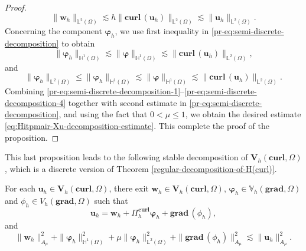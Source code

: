 \begin{proof}
\begin{equation}
\|\bm{w}_h\|_{\mathbb{L}^2(\Omega)} \lesssim h \|\textbf{curl} \,(\bm{u}_h)\|_{\mathbb{L}^2(\Omega)} \lesssim   \|\bm{u}_h\|_{\mathbb{L}^2(\Omega)}.
\end{equation}
Concerning the component $\bm{\varphi}_h$, we use first inequality in \eqref{pr-eq:semi-discrete-decomposition} to obtain
\begin{equation}
\|\bm{\varphi}_h\|_{\mathbb{H}^1(\Omega)} \lesssim \|\bm{\varphi}\|_{\mathbb{H}^1(\Omega)} \lesssim \|\textbf{curl} \,(\bm{u}_h)\|_{\mathbb{L}^2(\Omega)},
\end{equation}
and
\begin{equation}\label{pr-eq:semi-discrete-decomposition-4}
\|\bm{\varphi}_h\|_{\mathbb{L}^2(\Omega)} \leq \|\bm{\varphi}_h\|_{\mathbb{H}^1(\Omega)}  \lesssim  \|\bm{\varphi}\|_{\mathbb{H}^1(\Omega)}  \lesssim \|\textbf{curl} \,(\bm{u}_h)\|_{\mathbb{L}^2(\Omega)}.
\end{equation}
Combining \eqref{pr-eq:semi-discrete-decomposition-1}--\eqref{pr-eq:semi-discrete-decomposition-4} together with second estimate in \eqref{pr-eq:semi-discrete-decomposition}, and using the fact that $0 < \mu \leq 1$, we obtain the desired estimate  \eqref{eq:Hitpmair-Xu-decomposition-estimate}. This complete the proof of the proposition. 
\end{proof}

This last proposition leads to the following stable decomposition of $\bm{V}_h(\textbf{curl},\Omega)$, which is a discrete version of Theorem \ref{regular-decomposition-of-H(curl)}.

\begin{theorem}\label{thm:stable-Hitpmair-Xu-decomposition}
For each $\bm{u}_h \in \bm{V}_h(\textbf{curl},\Omega)$, there exit $\bm{w}_h \in \bm{V}_h(\textbf{curl},\Omega)$, $\bm{\varphi}_h \in  \mathbb{V}_h(\textbf{grad},\Omega)$ and $\phi_h \in V_h(\textbf{grad},\Omega)$ such that   
\begin{equation}\label{eq:stable-Hitpmair-Xu-decomposition}
\bm{u}_h=\bm{w}_h+\Pi_h^{\textbf{curl}} \bm{\varphi}_h + \textbf{grad}\,(\phi_h),
\end{equation}
and 
\begin{equation}\label{eq:stable-Hitpmair-Xu-decomposition-estimate}
\|\bm{w}_h\|_{A_\mu}^2 + \|\bm{\varphi}_h\|_{\mathbb{H}^1(\Omega)}^2 + \mu \|\bm{\varphi}_h\|_{\mathbb{L}^2(\Omega)}^2 + \|\textbf{grad}\,(\phi_h)\|_{A_\mu}^2 \lesssim \|\bm{u}_h\|_{A_\mu}^2.
\end{equation}
\end{theorem}

